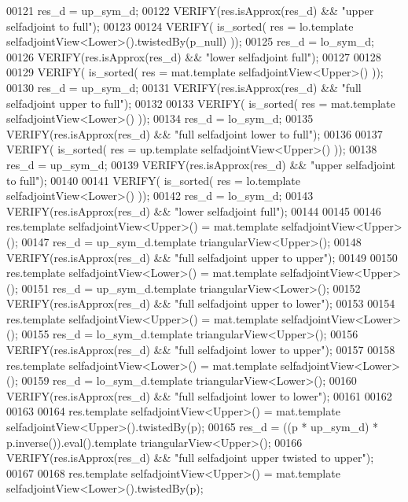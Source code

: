 \begin{DoxyCode}
00121   res\_d = up\_sym\_d;
00122   VERIFY(res.isApprox(res\_d) && \textcolor{stringliteral}{"upper selfadjoint to full"});
00123   
00124   VERIFY( is\_sorted( res = lo.template selfadjointView<Lower>().twistedBy(p\_null) ));
00125   res\_d = lo\_sym\_d;
00126   VERIFY(res.isApprox(res\_d) && \textcolor{stringliteral}{"lower selfadjoint full"});
00127 
00128 
00129   VERIFY( is\_sorted( res = mat.template selfadjointView<Upper>() ));
00130   res\_d = up\_sym\_d;
00131   VERIFY(res.isApprox(res\_d) && \textcolor{stringliteral}{"full selfadjoint upper to full"});
00132 
00133   VERIFY( is\_sorted( res = mat.template selfadjointView<Lower>() ));
00134   res\_d = lo\_sym\_d;
00135   VERIFY(res.isApprox(res\_d) && \textcolor{stringliteral}{"full selfadjoint lower to full"});
00136 
00137   VERIFY( is\_sorted( res = up.template selfadjointView<Upper>() ));
00138   res\_d = up\_sym\_d;
00139   VERIFY(res.isApprox(res\_d) && \textcolor{stringliteral}{"upper selfadjoint to full"});
00140 
00141   VERIFY( is\_sorted( res = lo.template selfadjointView<Lower>() ));
00142   res\_d = lo\_sym\_d;
00143   VERIFY(res.isApprox(res\_d) && \textcolor{stringliteral}{"lower selfadjoint full"});
00144 
00145 
00146   res.template selfadjointView<Upper>() = mat.template selfadjointView<Upper>();
00147   res\_d = up\_sym\_d.template triangularView<Upper>();
00148   VERIFY(res.isApprox(res\_d) && \textcolor{stringliteral}{"full selfadjoint upper to upper"});
00149 
00150   res.template selfadjointView<Lower>() = mat.template selfadjointView<Upper>();
00151   res\_d = up\_sym\_d.template triangularView<Lower>();
00152   VERIFY(res.isApprox(res\_d) && \textcolor{stringliteral}{"full selfadjoint upper to lower"});
00153 
00154   res.template selfadjointView<Upper>() = mat.template selfadjointView<Lower>();
00155   res\_d = lo\_sym\_d.template triangularView<Upper>();
00156   VERIFY(res.isApprox(res\_d) && \textcolor{stringliteral}{"full selfadjoint lower to upper"});
00157 
00158   res.template selfadjointView<Lower>() = mat.template selfadjointView<Lower>();
00159   res\_d = lo\_sym\_d.template triangularView<Lower>();
00160   VERIFY(res.isApprox(res\_d) && \textcolor{stringliteral}{"full selfadjoint lower to lower"});
00161 
00162   
00163   
00164   res.template selfadjointView<Upper>() = mat.template selfadjointView<Upper>().twistedBy(p);
00165   res\_d = ((p * up\_sym\_d) * p.inverse()).eval().template triangularView<Upper>();
00166   VERIFY(res.isApprox(res\_d) && \textcolor{stringliteral}{"full selfadjoint upper twisted to upper"});
00167   
00168   res.template selfadjointView<Upper>() = mat.template selfadjointView<Lower>().twistedBy(p);

\end{DoxyCode}
